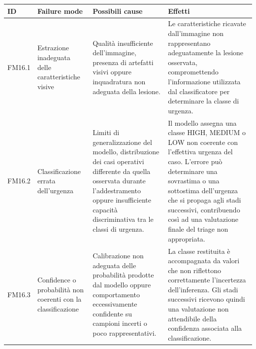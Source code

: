 \begin{table}[H]
    \centering
    \footnotesize
    \setlength{\tabcolsep}{3pt}
    \renewcommand{\arraystretch}{1.1}

    \begin{tabularx}{\textwidth}{
        >{\raggedright\arraybackslash}p{1.1cm}
        >{\raggedright\arraybackslash}p{3cm}
        >{\raggedright\arraybackslash}p{5cm}
        X
    }
        \toprule

        \textbf{ID} &
        \textbf{Failure mode} &
        \textbf{Possibili cause} &
        \textbf{Effetti} \\

        \midrule

        FM16.1 &
        Estrazione inadeguata delle caratteristiche visive &
        Qualità insufficiente dell'immagine, presenza di artefatti visivi oppure
        inquadratura non adeguata della lesione. &
        Le caratteristiche ricavate dall'immagine non rappresentano
        adeguatamente la lesione osservata, compromettendo l'informazione
        utilizzata dal classificatore per determinare la classe di urgenza. \\

        \midrule

        FM16.2 &
        Classificazione errata dell'urgenza &
        Limiti di generalizzazione del modello, distribuzione dei casi operativi
        differente da quella osservata durante l'addestramento oppure insufficiente
        capacità discriminativa tra le classi di urgenza. &
        Il modello assegna una classe HIGH, MEDIUM o LOW non coerente con
        l'effettiva urgenza del caso. L'errore può determinare una sovrastima
        o una sottostima dell'urgenza che si propaga agli stadi
        successivi, contribuendo così ad una valutazione finale del triage
        non appropriata. \\

        \midrule

        FM16.3 &
        Confidence o probabilità non coerenti con la classificazione &
        Calibrazione non adeguata delle probabilità prodotte dal modello
        oppure comportamento eccessivamente confidente su campioni
        incerti o poco rappresentativi. &
        La classe restituita è accompagnata da valori che non riflettono
        correttamente l'incertezza dell'inferenza. Gli stadi successivi
        ricevono quindi una valutazione non attendibile della confidenza
        associata alla classificazione. \\


\end{tabularx}
\end{table}
